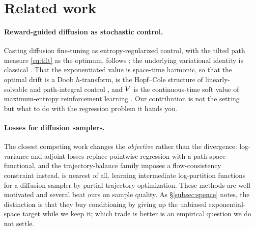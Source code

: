 \section{Related work}
\label{sec:08_related}

\paragraph{Reward-guided diffusion as stochastic control.}
Casting diffusion fine-tuning as entropy-regularized control, with the tilted
path measure \eqref{eq:tilt} as the optimum, follows
\citet{uehara2024finetuning}; the underlying variational identity is classical
\citep{daipra1991stochastic,leonard2014survey}. That the exponentiated value is
space-time harmonic, so that the optimal drift is a Doob $h$-transform, is the
Hopf--Cole structure of linearly-solvable and path-integral control
\citep{kappen2005path,todorov2009efficient}, and $V$ is the continuous-time
soft value of maximum-entropy reinforcement learning
\citep{haarnoja2017softq,levine2018rlasinference}. Our contribution is not the
setting but what to do with the regression problem it hands you.

\paragraph{Losses for diffusion samplers.}
The closest competing work changes the \emph{objective} rather than the
divergence: log-variance and adjoint losses
\citep{nusken2021logvariance,richter2020vargrad,domingoenrich2024adjoint,domingoenrich2023socm}
replace pointwise regression with a path-space functional, and the
trajectory-balance family
\citep{malkin2022trajectory,madan2023subtb,venkatraman2024rtb} imposes a
flow-consistency constraint instead. \citet{zhang2024dgfs} is nearest of all,
learning intermediate log-partition functions for a diffusion sampler by
partial-trajectory optimization. These methods are well motivated and several
beat ours on sample quality. As \S\ref{subsec:spence} notes, the distinction is
that they buy conditioning by giving up the unbiased exponential-space target
while we keep it; which trade is better is an empirical question we do not
settle.

